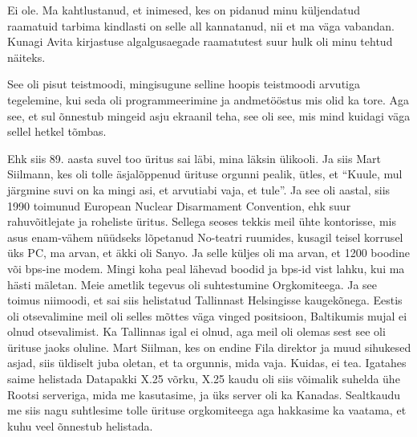 
Ei ole. Ma kahtlustanud, et inimesed, kes on pidanud minu küljendatud raamatuid tarbima kindlasti on selle all kannatanud, nii et ma väga vabandan. Kunagi  Avita kirjastuse  algalgusaegade raamatutest suur hulk oli minu tehtud  näiteks.


See oli pisut teistmoodi, mingisugune selline hoopis teistmoodi  arvutiga tegelemine, kui seda  oli  programmeerimine ja andmetööstus mis olid ka tore. Aga see, et sul õnnestub mingeid asju ekraanil teha, see oli see, mis mind kuidagi väga sellel hetkel tõmbas. 

Ehk siis 89. aasta suvel too üritus sai läbi, mina läksin ülikooli. Ja siis Mart Siilmann, kes oli tolle äsjalõppenud ürituse orgunni pealik, ütles, et \enquote{Kuule, mul järgmine suvi on ka mingi asi, et arvutiabi vaja, et tule}. Ja see oli aastal, siis 1990 toimunud European Nuclear Disarmament Convention, ehk suur rahuvõitlejate ja roheliste üritus. Sellega seoses tekkis meil ühte kontorisse, mis asus enam-vähem nüüdseks lõpetanud No-teatri ruumides, kusagil teisel korrusel üks PC, ma arvan, et äkki oli Sanyo. Ja selle küljes oli ma arvan, et 1200 boodine või bps-ine modem. Mingi koha peal lähevad boodid ja bps-id vist lahku, kui ma hästi mäletan.  Meie ametlik tegevus oli suhtestumine Orgkomiteega. Ja see toimus niimoodi, et sai siis helistatud Tallinnast Helsingisse kaugekõnega. Eestis oli otsevalimine meil oli selles mõttes väga vinged positsioon, Baltikumis mujal ei olnud otsevalimist. Ka Tallinnas igal ei olnud, aga meil oli olemas sest see oli ürituse jaoks oluline. Mart Siilman, kes on endine Fila direktor ja muud sihukesed asjad, siis üldiselt juba oletan, et ta orgunnis, mida vaja. Kuidas, ei tea. Igatahes saime helistada Datapakki X.25 võrku,  X.25 kaudu oli siis võimalik suhelda ühe Rootsi serveriga, mida me kasutasime, ja üks server oli ka Kanadas. Sealtkaudu me siis nagu suhtlesime tolle ürituse orgkomiteega aga  hakkasime ka vaatama, et kuhu veel õnnestub helistada.

